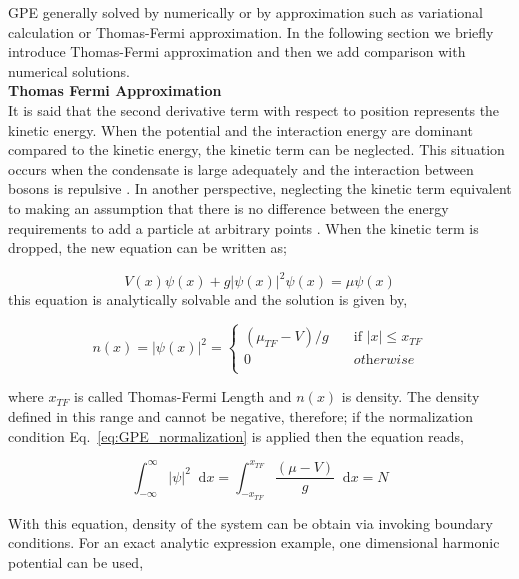 \documentclass[a4paper,times,hidelinks,12pt]{article}
\newcommand*\dif{\mathop{}\!\mathrm{d}}
\begin{document}
GPE generally solved by numerically or by approximation such as variational calculation or Thomas-Fermi approximation. In the following section we briefly introduce Thomas-Fermi approximation and then we add comparison with numerical solutions. \\

\textbf{Thomas Fermi Approximation}\\


It is said that the second derivative term with respect to position represents the kinetic energy. When the potential and the interaction energy are dominant compared to the kinetic energy, the kinetic term can be neglected. This situation occurs when the condensate is large adequately and the interaction between bosons is repulsive \cite{pethick2002bose}. In another perspective, neglecting the kinetic term equivalent to making an assumption that there is no difference between the energy requirements to add a particle at arbitrary points \cite{rogel2013gross}. When the kinetic term is dropped, the new equation can be written as;

\begin{equation}
\label{eq:GPE_1D_thomas_fermi}
    V(x)\psi(x) + g|\psi(x)|^2\psi(x) = \mu\psi(x)
\end{equation}
\noindent this equation is analytically solvable and the solution is given by,


\begin{equation}
\label{eq:thomas_fermi_solution}    
n(x) = |\psi(x)|^2 =  
    \begin{cases}
        (\mu_{TF} - V)/g &\quad\text{if }  |x| \le x_{TF}  \\
        0 &\quad \textit{otherwise} \\
    \end{cases}
\end{equation}

\noindent where $x_{TF}$ is called Thomas-Fermi Length and $n(x)$ is density. The density defined in this range and cannot be negative, therefore; if the normalization condition Eq.~\eqref{eq:GPE_normalization} is applied then the equation reads,  

\begin{equation}
    \label{eq:thomas_fermi_mu_integral}
        \int_{-\infty}^{\infty} |\psi|^2 \dif x = \int_{-x_{TF}}^{x_{TF}} \frac{(\mu - V)}{g} \dif x = N 
    \end{equation}

\noindent With this equation, density of the system can be obtain via invoking boundary conditions. For an exact analytic expression example, one dimensional harmonic potential can be used, 
\end{document}
